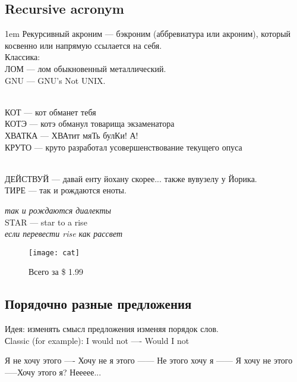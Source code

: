 \subsection{Recursive acronym}
\begin{flushleft}\parskip1em
    Рекурсивный акроним --- бэкроним (аббревиатура или акроним), который косвенно или напрямую ссылается на себя.\\
    Классика:\\
    ЛОМ --- лом обыкновенный металлический.\\
    GNU --- GNU's Not UNIX.

    \emph{}\\
    КОТ --- кот обманет тебя\\
    КОТЭ --- котэ обманул товарища экзаменатора\\
    ХВАТКА --- ХВАтит мяТь булКи! А!\\
    КРУТО --- круто разработал усовершенствование текущего опуса

    \emph{}\\
    ДЕЙСТВУЙ --- давай енту йохану скорее... также вувузелу у Йорика.\\
    ТИРЕ --- так и рождаются еноты.

    \emph{так и рождаются диалекты}\\
    STAR --- star to a rise\\
    \emph{если перевести rise как рассвет}
\end{flushleft}
\begin{figure}[ht!]
    \centering
    \texttt{[image: cat]}
    \caption{Всего за \$ 1.99}
\end{figure}

\subsection{Порядочно разные предложения}
Идея: изменять смысл предложения изменяя порядок слов.\\

Сlassic (for example): I would not —- Would I not


Я не хочу этого —- Хочу не я этого —— Не этого хочу я —— Я хочу не этого —--Хочу этого я? Неееее...
